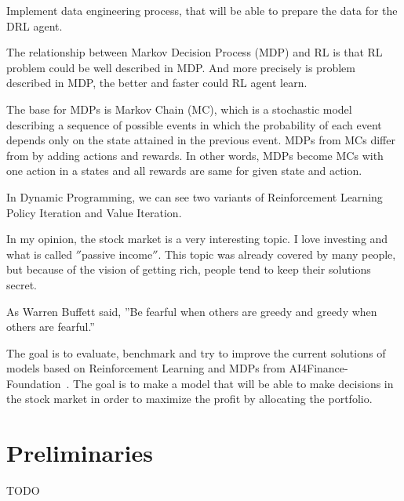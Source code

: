 Implement data engineering process, that will be able to prepare the data for the DRL agent.


The relationship between Markov Decision Process (MDP) and RL is
that RL problem could be well described in MDP\@.
And more precisely is problem described in MDP,
the better and faster could RL agent learn.

The base for MDPs is Markov Chain (MC),
which is a stochastic model describing a sequence of possible events in which the probability
of each event depends only on the state attained in the previous event.
MDPs from MCs differ from by adding actions and rewards.
In other words, MDPs become MCs with one action in a states and all rewards are same
for given state and action.

In Dynamic Programming, we can see two variants of Reinforcement Learning
Policy Iteration and Value Iteration.

In my opinion, the stock market is a very interesting topic.
I love investing and what is called \(''\)passive income\(''\).
This topic was already covered by many people, but because of the
vision of getting rich, people tend to keep their solutions secret.

As Warren Buffett said, ''Be fearful when others are greedy and greedy when others are fearful.''

The goal is to evaluate, benchmark and try to improve the current solutions of models
based on Reinforcement Learning and MDPs from AI4Finance-Foundation~\cite{https://doi.org/10.48550/arxiv.2111.03995}.
The goal is to make a model that will be able to make decisions in the stock market
in order to maximize the profit by allocating the portfolio.






\chapter{Preliminaries}\label{ch:preliminaries}
TODO


